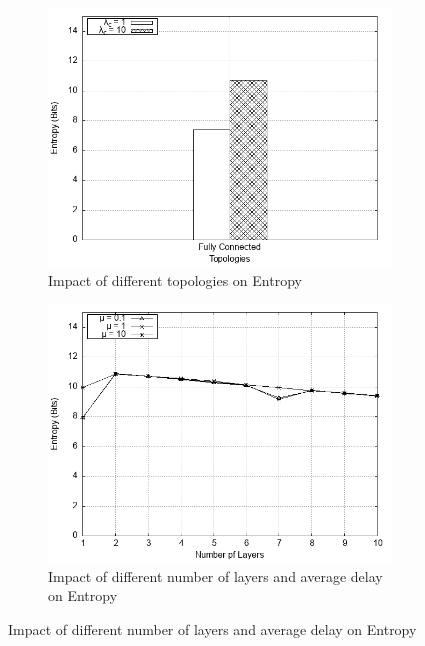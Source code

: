 \documentclass[logo,msc,cyber]{infthesis}   %
\begin{document}
\begin{figure}[h!]
    \centering
    \begin{subfigure}[b]{0.45\textwidth}
        \centering
        \includegraphics[width=\textwidth]{figures/mixim/2.png}
        \caption{Impact of different topologies on Entropy}
        \label{fig:mixim-different-topologies}
    \end{subfigure}
    \hfill
    \begin{subfigure}[b]{0.45\textwidth}
        \centering
        \includegraphics[width=\textwidth]{figures/mixim/3.png}
        \caption{Impact of different number of layers and average delay on Entropy}
        \label{fig:mixim-different-layers}
    \end{subfigure}
 \end{figure}
\end{document}
